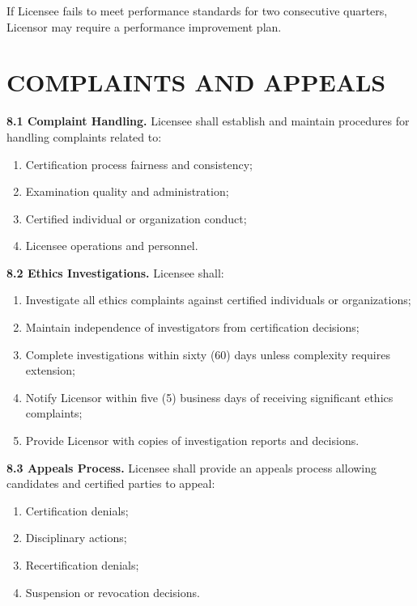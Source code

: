\documentclass[11pt,a4paper]{article}
\begin{document}
If Licensee fails to meet performance standards for two consecutive quarters, Licensor may require a performance improvement plan.

\section{COMPLAINTS AND APPEALS}

\textbf{8.1 Complaint Handling.} Licensee shall establish and maintain procedures for handling complaints related to:

\begin{enumerate}[label=\alph*)]
\item Certification process fairness and consistency;
\item Examination quality and administration;
\item Certified individual or organization conduct;
\item Licensee operations and personnel.
\end{enumerate}

\textbf{8.2 Ethics Investigations.} Licensee shall:

\begin{enumerate}[label=\alph*)]
\item Investigate all ethics complaints against certified individuals or organizations;
\item Maintain independence of investigators from certification decisions;
\item Complete investigations within sixty (60) days unless complexity requires extension;
\item Notify Licensor within five (5) business days of receiving significant ethics complaints;
\item Provide Licensor with copies of investigation reports and decisions.
\end{enumerate}

\textbf{8.3 Appeals Process.} Licensee shall provide an appeals process allowing candidates and certified parties to appeal:

\begin{enumerate}[label=\alph*)]
\item Certification denials;
\item Disciplinary actions;
\item Recertification denials;
\item Suspension or revocation decisions.
\end{enumerate}
\end{document}
